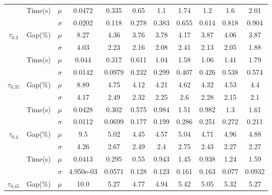 \documentclass[spanish, a4paper, 12pt, openany,final]{book}
\begin{document}
\begin{table}[h]
\begin{adjustbox}{width=\columnwidth,center}
\begin{tabular}{|ccc|cccccccc|}
			\cline{3-11}
			& \multirow{2}{*}{Time(s)} 								  & $\mu$    & 0.0472 & 0.335 & 0.65 & 1.1 & 1.74 & 1.2 & 1.6 & 2.01\\
			&                                                         & $\sigma$ & 0.0202 & 0.118 & 0.278 & 0.383 & 0.655 & 0.614 & 0.818 & 0.904 \\
			\hline
			\multirow{4}{*}{$\tau_{0.3}$} & \multirow{2}{*}{Gap(\%)}  & $\mu$    & 8.27 & 4.36 & 3.76 & 3.78 & 4.17 & 3.87 & 4.06 & 3.87\\
			&                                                   	  & $\sigma$ & 4.03 & 2.23 & 2.16 & 2.08 & 2.41 & 2.13 & 2.05 & 1.88 \\
			\cline{3-11}
			& \multirow{2}{*}{Time(s)} 								  & $\mu$    & 0.044 & 0.317 & 0.611 & 1.04 & 1.58 & 1.06 & 1.41 & 1.79\\
			&                                                   	  & $\sigma$ & 0.0142 & 0.0979 & 0.232 & 0.299 & 0.407 & 0.426 & 0.538 & 0.574 \\
			\hline
			\multirow{4}{*}{$\tau_{0.35}$} & \multirow{2}{*}{Gap(\%)} & $\mu$    & 8.89 & 4.75 & 4.12 & 4.21 & 4.62 & 4.32 & 4.53 & 4.4\\
			&                                                   	  & $\sigma$ & 4.17 & 2.49 & 2.32 & 2.25 & 2.6 & 2.28 & 2.15 & 2.1 \\
			\cline{3-11}
			& \multirow{2}{*}{Time(s)} 								  & $\mu$    & 0.0428 & 0.302 & 0.575 & 0.984 & 1.51 & 0.982 & 1.3 & 1.61\\
			&                                                   	  & $\sigma$ & 0.0112 & 0.0699 & 0.177 & 0.199 & 0.286 & 0.251 & 0.272 & 0.211 \\
			\hline
			\multirow{4}{*}{$\tau_{0.4}$} & \multirow{2}{*}{Gap(\%)}  & $\mu$    & 9.5 & 5.02 & 4.45 & 4.57 & 5.04 & 4.71 & 4.96 & 4.88\\
			&                                                   	  & $\sigma$ & 4.26 & 2.67 & 2.49 & 2.4 & 2.75 & 2.43 & 2.27 & 2.27 \\
			\cline{3-11}
			& \multirow{2}{*}{Time(s)}                                & $\mu$    & 0.0413 & 0.295 & 0.55 & 0.943 & 1.45 & 0.938 & 1.24 & 1.59\\
			&                                                         & $\sigma$ & 4.950e-03 & 0.0571 & 0.128 & 0.123 & 0.161 & 0.163 & 0.077 & 0.0932 \\
			\hline
			\multirow{4}{*}{$\tau_{0.45}$} & \multirow{2}{*}{Gap(\%)} & $\mu$    & 10.0 & 5.27 & 4.77 & 4.94 & 5.42 & 5.05 & 5.32 & 5.27\\

\end{tabular}
\end{adjustbox}
\end{table}
\end{document}
